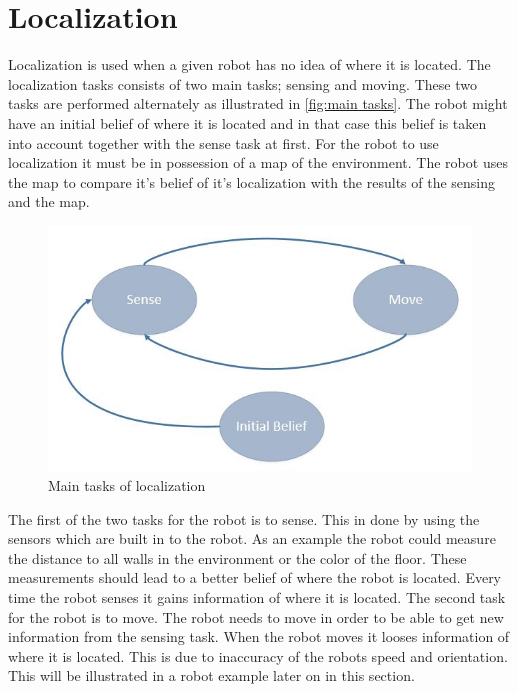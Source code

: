 
\section{Localization} %
\label{sec:localization}

Localization is used when a given robot has no idea of where it is located. The localization tasks consists of two main tasks; sensing and moving. These two tasks are performed alternately as illustrated in \autoref{fig:main tasks}. The robot might have an initial belief of where it is located and in that case this belief is taken into account together with the sense task at first. For the robot to use localization it must be in possession of a map of the environment. The robot uses the map to compare it's belief of it's localization with the results of the sensing and the map.\\

\begin{figure}[h]
\centering
\includegraphics[scale=0.45]{images/SenseMoveInitialBelief}
\caption{Main tasks of localization}
\label{fig:main tasks}
\end{figure}



The first of the two tasks for the robot is to sense. This in done by using the sensors which are built in to the robot. As an example the robot could measure the distance to all walls in the environment or the color of the floor. These measurements should lead to a better belief of where the robot is located. Every time the robot senses it gains information of where it is located. The second task for the robot is to move. The robot needs to move in order to be able to get new information from the sensing task. When the robot moves it looses information of where it is located. This is due to inaccuracy of the robots speed and orientation. This will be illustrated in a robot example later on in this section.\\

